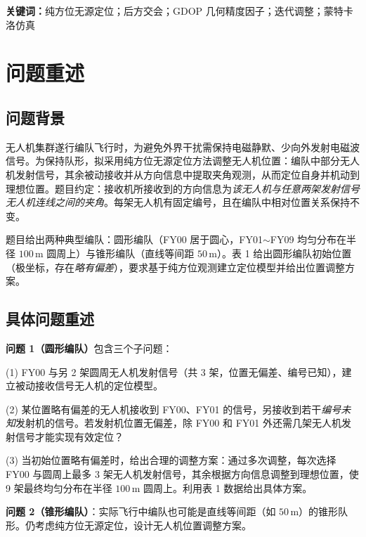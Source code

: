 \documentclass[12pt,a4paper]{ctexart}
\newcommand{\unit}[1]{\ensuremath{\,\mathrm{#1}}}
\begin{document}
\bigskip

\noindent\textbf{关键词：}纯方位无源定位；后方交会；GDOP 几何精度因子；迭代调整；蒙特卡洛仿真

\newpage

\section{问题重述}

\subsection{问题背景}

无人机集群遂行编队飞行时，为避免外界干扰需保持电磁静默、少向外发射电磁波信号。为保持队形，拟采用纯方位无源定位方法调整无人机位置：编队中部分无人机发射信号，其余被动接收并从方向信息中提取夹角观测，从而定位自身并机动到理想位置。题目约定：接收机所接收到的方向信息为\emph{该无人机与任意两架发射信号无人机连线之间的夹角}。每架无人机有固定编号，且在编队中相对位置关系保持不变。

题目给出两种典型编队：圆形编队（FY00 居于圆心，FY01$\sim$FY09 均匀分布在半径 $100\unit{m}$ 圆周上）与锥形编队（直线等间距 $50\unit{m}$）。表 1 给出圆形编队初始位置（极坐标，存在\emph{略有偏差}），要求基于纯方位观测建立定位模型并给出位置调整方案。

\subsection{具体问题重述}

\textbf{问题 1（圆形编队）}包含三个子问题：

(1) FY00 与另 2 架圆周无人机发射信号（共 3 架，位置无偏差、编号已知），建立被动接收信号无人机的定位模型。

(2) 某位置略有偏差的无人机接收到 FY00、FY01 的信号，另接收到若干\emph{编号未知}发射机的信号。若发射机位置无偏差，除 FY00 和 FY01 外还需几架无人机发射信号才能实现有效定位？

(3) 当初始位置略有偏差时，给出合理的调整方案：通过多次调整，每次选择 FY00 与圆周上最多 3 架无人机发射信号，其余根据方向信息调整到理想位置，使 9 架最终均匀分布在半径 $100\unit{m}$ 圆周上。利用表 1 数据给出具体方案。

\textbf{问题 2（锥形编队）}：实际飞行中编队也可能是直线等间距（如 $50\unit{m}$）的锥形队形。仍考虑纯方位无源定位，设计无人机位置调整方案。
\end{document}
